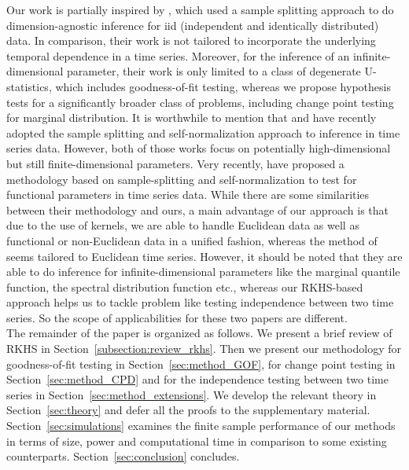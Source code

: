 \documentclass[11pt]{article}
\theoremstyle{plain}
\theoremstyle{definition}
\theoremstyle{remark}
\begin{document}
\indent Our work is partially inspired by \cite{kim2024dimension}, which used a sample splitting approach to do dimension-agnostic inference for iid (independent and identically distributed) data.  In comparison, their work is not tailored to incorporate the underlying temporal dependence in a time series. Moreover, for the inference of an infinite-dimensional parameter, their work is only limited to a class of degenerate U-statistics, which includes goodness-of-fit testing, whereas we propose hypothesis tests for a significantly broader class of problems,  including change point testing for marginal distribution. It is worthwhile to mention that \cite{gao2023dimension} and \cite{zhang2024another} have recently adopted the sample splitting and self-normalization approach to inference in time series data. However, both of those works focus on potentially high-dimensional but still finite-dimensional  parameters. Very recently, \cite{Zhang27032025} have proposed a methodology based on sample-splitting and self-normalization to test for functional parameters in time series data. While there are some similarities between their methodology and ours, a main advantage of our approach is that due to the use of kernels, we are able to handle Euclidean data as well as functional or non-Euclidean data in a unified fashion, whereas the method of \cite{Zhang27032025} seems tailored to Euclidean time series. 
However, it should be noted that they are able to do inference for infinite-dimensional parameters like the marginal quantile function, the spectral distribution function etc., whereas our RKHS-based approach helps us to tackle problem like testing independence between two time series. So the scope of applicabilities for these two papers are different.\\

\indent The remainder of the paper is organized as follows. We present a brief review of RKHS in  Section~\ref{subsection:review_rkhs}. Then we present our methodology for goodness-of-fit testing in Section~\ref{sec:method_GOF}, for change point testing in Section~\ref{sec:method_CPD} and for the independence testing between two time series in Section~\ref{sec:method_extensions}. We develop the relevant theory in Section~\ref{sec:theory} and defer all the proofs to the supplementary material. 
Section~\ref{sec:simulations} examines the finite sample performance of our methods in terms of size, power and computational time  in comparison to some existing counterparts. Section~\ref{sec:conclusion} concludes. 
\\
\end{document}
